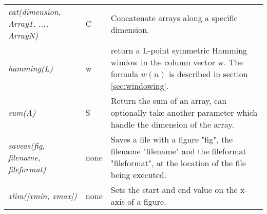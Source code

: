 \begin{longtabu}{>{\em}X l X}
cat(dimension, Array1, ..., ArrayN) & C & Concatenate arrays along a specific dimension.  \\
hamming(L) & w & return a L-point symmetric Hamming window in the column vector w. The formula $w(n)$ is described in section \ref{sec:windowing}. \\
sum(A) & S & Return the sum of an array, can optionally take another parameter which handle the dimension of the array. \\
saveas(fig, filename, fileformat) & none & Saves a file with a figure "fig", the filename "filename" and the fileformat "fileformat", at the location of the file being executed. \\
xlim([xmin, xmax]) & none & Sets the start and end value on the x-axis of a figure. \\
\end{longtabu}
